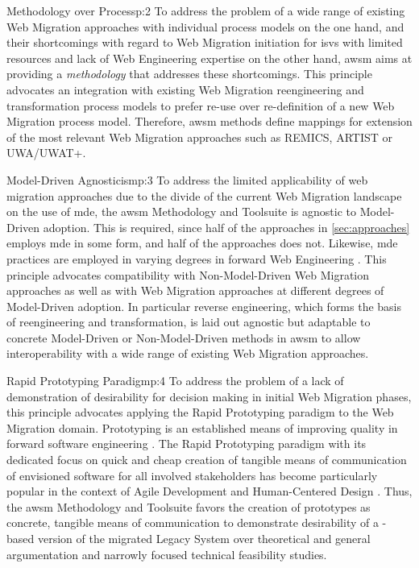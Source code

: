 \begin{thesisprinciple}{Methodology over Process}{p:2}
To address the problem of a wide range of existing \gls{Web Migration} approaches with individual process models on the one hand, and their shortcomings with regard to \gls{Web Migration} initiation for \glspl{isv} with limited resources and lack of \gls{Web Engineering} expertise on the other hand, \gls{awsm} aims at providing a \emph{methodology} that addresses these shortcomings.
This principle advocates an integration with existing \gls{Web Migration} reengineering and transformation process models to prefer re-use over re-definition of a new \gls{Web Migration} process model.
Therefore, \gls{awsm} methods define mappings for extension of the most relevant \gls{Web Migration} approaches such as REMICS, ARTIST or UWA/UWAT+.
\end{thesisprinciple}

\begin{thesisprinciple}{Model-Driven Agnosticism}{p:3}
To address the limited applicability of web migration approaches due to the divide of the current \gls{Web Migration} landscape on the use of \gls{mde}, the \gls{awsm} Methodology and Toolsuite is agnostic to Model-Driven adoption.
This is required, since half of the approaches in \cref{sec:approaches}  employs \gls{mde} in some form, and half of the approaches does not.
Likewise, \gls{mde} practices are employed in varying degrees in forward \gls{Web Engineering} \autocite{Moreno2008MDWE}.
This principle advocates compatibility with Non-Model-Driven \gls{Web Migration} approaches as well as with \gls{Web Migration} approaches at different degrees of Model-Driven adoption.
In particular reverse engineering, which forms the basis of reengineering and transformation, is laid out agnostic but adaptable to concrete Model-Driven or Non-Model-Driven methods in \gls{awsm} to allow interoperability with a wide range of existing \gls{Web Migration} approaches.
\end{thesisprinciple}

\begin{thesisprinciple}{Rapid Prototyping Paradigm}{p:4}
To address the problem of a lack of demonstration of desirability for decision making in initial \gls{Web Migration} phases, this principle advocates applying the \gls{Rapid Prototyping} paradigm to the \gls{Web Migration} domain.
\gls{Prototyping} is an established means of improving quality in forward software engineering \autocite{Wallmueller2001SoftwareQuality}.
The \gls{Rapid Prototyping} paradigm \autocite{Gordon1995RapidPrototyping} with its dedicated focus on quick and cheap creation of tangible means of communication of envisioned software for all involved stakeholders \autocite{Alavi1984} has become particularly popular in the context of Agile Development \autocite{Abrahamsson2002Agile} and Human-Centered Design \autocite{HCD2015}.
Thus, the \gls{awsm} Methodology and Toolsuite favors the creation of prototypes as concrete, tangible means of communication to demonstrate desirability of a -based version of the migrated \gls{Legacy System} over theoretical and general argumentation and narrowly focused technical feasibility studies.
\end{thesisprinciple}

